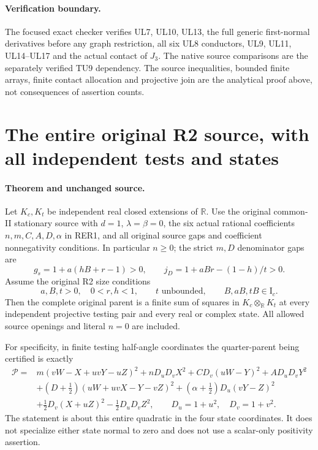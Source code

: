 \paragraph{Verification boundary.}
The focused exact checker verifies UL7, UL10, UL13, the full
generic first-normal derivatives before any graph restriction,
all six UL8 conductors, UL9, UL11, UL14--UL17 and the actual
contact of $J_3$. The native source comparisons are the separately
verified TU9 dependency. The source inequalities, bounded finite
arrays, finite contact allocation and projective join are the
analytical proof above, not consequences of assertion counts.


\section{\texorpdfstring{The entire original R2 source, with all independent tests and states}{The entire original R2 source, with all independent tests and states}}
\label{component:p913a09bcdcda}

\label{p913a09bcdcda:sec:r2-complete-rederived}

\paragraph{Theorem and unchanged source.}
Let \(K_c,K_t\) be independent real closed extensions of
\(\mathbb R\).  Use the original common-II stationary source
with \(d=1\), \(\lambda=\beta=0\), the six actual rational
coefficients \(n,m,C,A,D,\alpha\) in RER1, and all original
source gaps and coefficient nonnegativity conditions.
In particular \(n\geq0\); the strict \(m,D\) denominator
gaps are
\[
 g_s=1+a(hB+r-1)>0,\qquad
 j_D=1+aBr-(1-h)/t>0 .
\]
Assume the original R2 size conditions
\[
 a,B,t>0,\quad 0<r,h<1,\qquad
 t\text{ unbounded},\qquad B,aB,tB\in\mathrm I_c .
                                                               \tag{R2A1}
\]
Then the complete original parent is a finite sum of squares
in \(K_c\otimes_{\mathbb R}K_t\) at every independent projective
testing pair and every real or complex state.
All allowed source openings and literal \(n=0\) are included.

For specificity, in finite testing half-angle coordinates the
quarter-parent being certified is exactly
\[
\begin{split}
 \mathcal P={}&m(vW-X+uvY-uZ)^2+nD_uD_vX^2
       +CD_v(uW-Y)^2+AD_uD_vY^2\\
 &+(D+\tfrac12)(uW+uvX-Y-vZ)^2
       +(\alpha+\tfrac12)D_u(vY-Z)^2\\
 &+\tfrac12D_v(X+uZ)^2-\tfrac12D_uD_vZ^2,
 \qquad D_u=1+u^2,\quad D_v=1+v^2 .
\end{split}                                                     \tag{R2A2}
\]
The statement is about this entire quadratic in the four state
coordinates.  It does not specialize either state normal to zero
and does not use a scalar-only positivity assertion.

